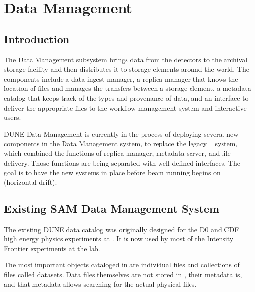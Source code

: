 \documentclass[../main-v1.tex]{subfiles}
\begin{document}
\chapter{Data Management  }
\label{ch:datamgmt}

\section{Introduction }
\label{sec:datamgmt:xyz}  %

The Data Management subsystem brings data from the detectors to the archival storage facility 
and then distributes it to storage elements around the world.  The components include a data ingest manager, a
replica manager that knows the location of files and manages the transfers between a storage element, a metadata 
catalog that keeps track of the types and provenance of data, and an interface to deliver the appropriate files 
to the workflow management system and interactive users.

DUNE Data Management is currently in the process of deploying several new components in the Data Management
system, to replace the legacy ~\cite{Illingworth:2014mba} system, which combined the functions of replica manager, metadata server, 
and file delivery.  Those functions are being separated with well defined   interfaces.  The goal is to have the new systems in place before beam running begins on  %
(horizontal drift).  


\label{ch:sam:catalog}

\section{Existing SAM Data Management System}

The existing DUNE data catalog  was originally designed for the D0 and CDF high energy physics experiments at .  It is now used by most of the Intensity Frontier experiments at the lab. %

The most important objects cataloged in  are individual files and collections of files called
datasets.
Data files themselves are not stored in , their metadata is, and that metadata allows %
searching for the actual physical files.
\end{document}
